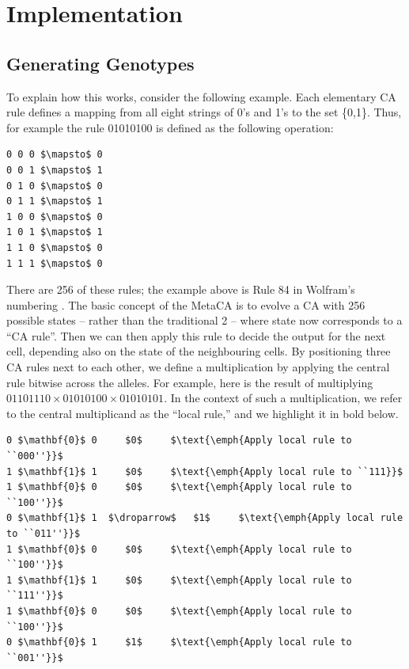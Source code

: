 \documentclass{AISB2008}
\newcommand{\droparrow}{%
  \mathchoice{\raisebox{-4pt}{$\displaystyle\mapsto$}}
             {\raisebox{-4pt}{$\mapsto$}}
             {\raisebox{-2pt}{$\scriptstyle\mapsto$}}
             {\raisebox{-2pt}{$\scriptscriptstyle\mapsto$}}}
\begin{document}

\section{Implementation}


\subsection{Generating Genotypes} \label{sec:geno}

To explain how this works, consider the following example.  Each
elementary CA rule defines a mapping from all eight strings of 0's and
1's to the set \{0,1\}.  Thus, for example the rule 01010100 is defined as the following operation:
\begin{lstlisting}[mathescape]
0 0 0 $\mapsto$ 0
0 0 1 $\mapsto$ 1
0 1 0 $\mapsto$ 0
0 1 1 $\mapsto$ 1
1 0 0 $\mapsto$ 0
1 0 1 $\mapsto$ 1
1 1 0 $\mapsto$ 0
1 1 1 $\mapsto$ 0
\end{lstlisting}

There are 256 of these rules; the example above is Rule 84 in
Wolfram's numbering \cite{wolfram1994cellular}.  The basic concept of
the MetaCA is to evolve a CA with 256 possible states -- rather than
the traditional 2 -- where state now corresponds to a ``CA rule''.
Then we can then apply this rule to decide the output for the next
cell, depending also on the state of the neighbouring cells.  By
positioning three CA rules next to each other, we define a
multiplication by applying the central rule bitwise across the alleles.
%
For example, here is the result of multiplying $01101110\times
01010100\times 01010101$.  In the context of such a multiplication, we
refer to the central multiplicand as the ``local rule,'' and we
highlight it in bold below.

\lstset{
  xleftmargin=.1\columnwidth, xrightmargin=.01\columnwidth
}

\begin{lstlisting}[mathescape]
0 $\mathbf{0}$ 0     $0$     $\text{\emph{Apply local rule to ``000''}}$
1 $\mathbf{1}$ 1     $0$     $\text{\emph{Apply local rule to ``111}}$
1 $\mathbf{0}$ 0     $0$     $\text{\emph{Apply local rule to ``100''}}$
0 $\mathbf{1}$ 1  $\droparrow$   $1$     $\text{\emph{Apply local rule to ``011''}}$
1 $\mathbf{0}$ 0     $0$     $\text{\emph{Apply local rule to ``100''}}$
1 $\mathbf{1}$ 1     $0$     $\text{\emph{Apply local rule to ``111''}}$
1 $\mathbf{0}$ 0     $0$     $\text{\emph{Apply local rule to ``100''}}$
0 $\mathbf{0}$ 1     $1$     $\text{\emph{Apply local rule to ``001''}}$
\end{lstlisting}
\end{document}
